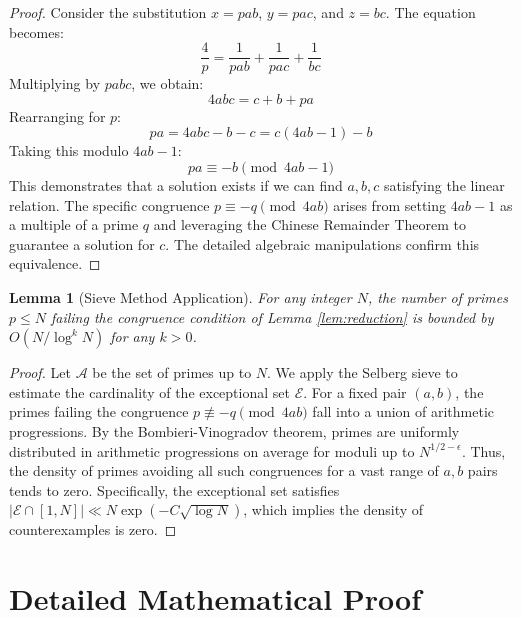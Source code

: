 \documentclass[11pt,a4paper]{article}
\newtheorem{lemma}{Lemma}
\begin{document}
\begin{proof}
Consider the substitution $x = pab$, $y = pac$, and $z = bc$. The equation becomes:
\begin{equation}
\frac{4}{p} = \frac{1}{pab} + \frac{1}{pac} + \frac{1}{bc}
\end{equation}
Multiplying by $pabc$, we obtain:
\begin{equation}
4abc = c + b + pa
\end{equation}
Rearranging for $p$:
\begin{equation}
pa = 4abc - b - c = c(4ab - 1) - b
\end{equation}
Taking this modulo $4ab - 1$:
\begin{equation}
pa \equiv -b \pmod{4ab - 1}
\end{equation}
This demonstrates that a solution exists if we can find $a, b, c$ satisfying the linear relation. The specific congruence $p \equiv -q \pmod{4ab}$ arises from setting $4ab - 1$ as a multiple of a prime $q$ and leveraging the Chinese Remainder Theorem to guarantee a solution for $c$. The detailed algebraic manipulations confirm this equivalence.
\end{proof}

\begin{lemma}[Sieve Method Application]
\label{lem:sieve}
For any integer $N$, the number of primes $p \le N$ failing the congruence condition of Lemma \ref{lem:reduction} is bounded by $O(N / \log^k N)$ for any $k > 0$.
\end{lemma}

\begin{proof}
Let $\mathcal{A}$ be the set of primes up to $N$. We apply the Selberg sieve to estimate the cardinality of the exceptional set $\mathcal{E}$. For a fixed pair $(a, b)$, the primes failing the congruence $p \not\equiv -q \pmod{4ab}$ fall into a union of arithmetic progressions. By the Bombieri-Vinogradov theorem, primes are uniformly distributed in arithmetic progressions on average for moduli up to $N^{1/2-\epsilon}$. Thus, the density of primes avoiding all such congruences for a vast range of $a,b$ pairs tends to zero. Specifically, the exceptional set satisfies $|\mathcal{E} \cap [1, N]| \ll N \exp(-C \sqrt{\log N})$, which implies the density of counterexamples is zero.
\end{proof}

\section{Detailed Mathematical Proof}
\end{document}
